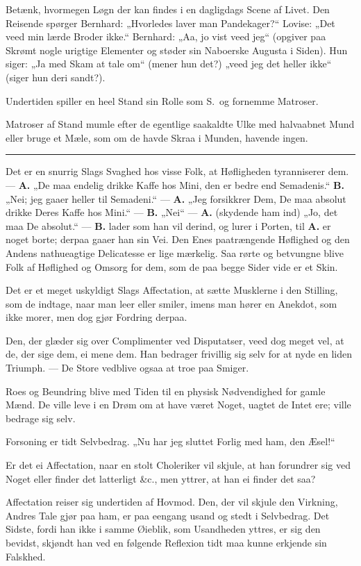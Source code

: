 \documentclass[12pt]{article}
\newcommand{\opage}[1]{\marginnote{\footnotesize\textit{[#1]}}}
\newcommand{\ombreak}{\par\medskip\begin{center}\rule{0.32\textwidth}{0.4pt}\end{center}\medskip}
\begin{document}
Betænk, hvormegen Løgn der kan findes i en dagligdags Scene af Livet. Den Reisende spørger Bernhard: „Hvorledes \opage{180}laver man Pandekager?`` Lovise: „Det veed min lærde Broder ikke.`` Bernhard: „Aa, jo vist veed jeg`` (opgiver paa Skrømt nogle urigtige Elementer og støder sin Naboerske Augusta i Siden). Hun siger: „Ja med Skam at tale om`` (mener hun det?) „veed jeg det heller ikke`` (siger hun deri sandt?).

Undertiden spiller en heel Stand sin Rolle som S.\ og fornemme Matroser.

Matroser af Stand mumle efter de egentlige saakaldte Ulke med halvaabnet Mund eller bruge et Mæle, som om de havde Skraa i Munden, havende ingen.

\ombreak

Det er en snurrig Slags Svaghed hos visse Folk, at Høfligheden tyranniserer dem. --- \textbf{A.} „De maa endelig drikke Kaffe hos Mini, den er bedre end Semadenis.`` \textbf{B.} „Nei; jeg gaaer heller til Semadeni.`` --- \textbf{A.} „Jeg forsikkrer Dem, De maa absolut drikke Deres Kaffe hos Mini.`` --- \textbf{B.} „Nei`` --- \textbf{A.} (skydende ham ind) „Jo, det maa De absolut.`` --- \textbf{B.} lader som han vil derind, og lurer i Porten, til \textbf{A.} er noget borte; derpaa gaaer han sin Vei. Den Enes paatrængende Høflighed og den Andens nathueagtige Delicatesse er lige mærkelig. Saa rørte og betvungne blive Folk af Høflighed og Omsorg for dem, som de paa begge Sider vide er et Skin.

Det er et meget uskyldigt Slags Affectation, at sætte Musklerne i den Stilling, som de indtage, naar man leer eller smiler, imens man hører en Anekdot, som ikke morer, men dog gjør Fordring derpaa.

\opage{181}Den, der glæder sig over Complimenter ved Disputatser, veed dog meget vel, at de, der sige dem, ei mene dem. Han bedrager frivillig sig selv for at nyde en liden Triumph. --- De Store vedblive ogsaa at troe paa Smiger.

Roes og Beundring blive med Tiden til en physisk Nødvendighed for gamle Mænd. De ville leve i en Drøm om at have været Noget, uagtet de Intet ere; ville bedrage sig selv.

Forsoning er tidt Selvbedrag. „Nu har jeg sluttet Forlig med ham, den Æsel!``

Er det ei Affectation, naar en stolt Choleriker vil skjule, at han forundrer sig ved Noget eller finder det latterligt \&c., men yttrer, at han ei finder det saa?

Affectation reiser sig undertiden af Hovmod. Den, der vil skjule den Virkning, Andres Tale gjør paa ham, er paa eengang usand og stedt i Selvbedrag. Det Sidste, fordi han ikke i samme Øieblik, som Usandheden yttres, er sig den bevidst, skjøndt han ved en følgende Reflexion tidt maa kunne erkjende sin Falskhed.
\end{document}
